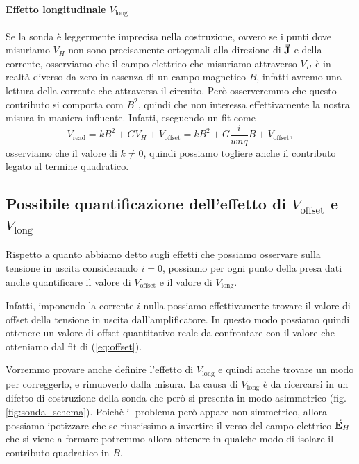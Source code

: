 \documentclass[fleqn,varvw]{memo}
\newcommand\vlong{V_\text{long}}
\begin{document}
\paragraph{Effetto longitudinale $V_\text{long}$} Se la sonda è leggermente imprecisa nella costruzione, ovvero se i punti dove misuriamo $V_H$ non sono precisamente ortogonali alla direzione di $\va{J}$ e della corrente, osserviamo che il campo elettrico che misuriamo attraverso $V_H$ è in realtà diverso da zero in assenza di un campo magnetico $B$, infatti avremo una lettura della corrente che attraversa il circuito. Però osserveremmo che questo contributo si comporta com $B^2$, quindi che non interessa effettivamente la nostra misura in maniera influente. Infatti, eseguendo un fit come \begin{equation}
    V_\text{read} = kB^2 +  GV_H + V_\text{offset} = kB^2 + G\frac{i}{wnq}B + V_\text{offset},\label{eq:B2_dep}
\end{equation} osserviamo che il valore di $k\neq0$, quindi possiamo togliere anche il contributo legato al termine quadratico. 

\subsection{Possibile quantificazione dell'effetto di $V_\text{offset}$ e $V_\text{long}$}

 Rispetto a quanto abbiamo detto sugli effetti che possiamo osservare sulla tensione in uscita considerando $i=0$, possiamo per ogni punto della presa dati anche quantificare il valore di $V_\text{offset}$ e il valore di $V_\text{long}$. 

Infatti, imponendo la corrente $i$ nulla possiamo effettivamente trovare il valore di offset della tensione in uscita dall'amplificatore. In questo modo possiamo quindi ottenere un valore di offset quantitativo reale da confrontare con il valore che otteniamo dal fit di (\ref{eq:offset}). 

Vorremmo provare anche definire l'effetto di $\vlong$ e quindi anche trovare un modo per correggerlo, e rimuoverlo dalla misura. La causa di $\vlong$ è da ricercarsi in un difetto di costruzione della sonda che però si presenta in modo asimmetrico (fig. \ref{fig:sonda_schema}). Poichè il problema però appare non simmetrico, allora possiamo ipotizzare che se riuscissimo a invertire il verso del campo elettrico $\va{E}_H$ che si viene a formare potremmo allora ottenere in qualche modo di isolare il contributo quadratico in $B$. 
\end{document}
